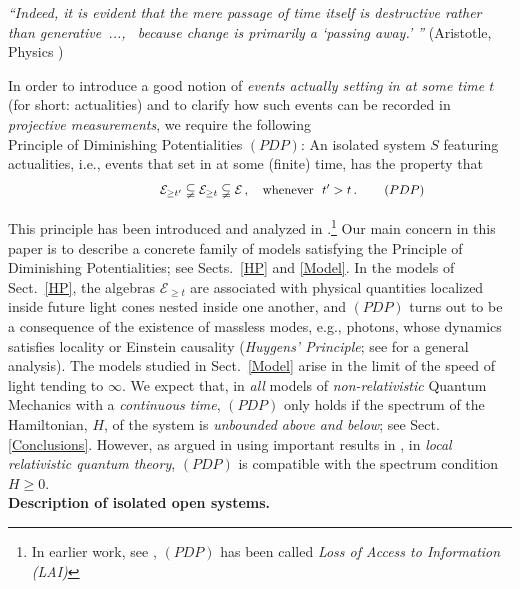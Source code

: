 \documentclass[12pt]{article}
\begin{document}
\hspace{0.5cm}\textit{``Indeed, it is evident that the mere passage of time itself is destructive rather than
\mbox{generative ..., } because change is primarily a `passing away.' ''}  (Aristotle, Physics )

In order to introduce a good notion of \textit{events actually setting in at some time $t$} (for short: actualities) and to clarify
how such events can be recorded in \textit{projective measurements}, we require the following \\

{Principle of Diminishing Potentialities} $(PDP)$: An isolated system $S$ featuring actualities, i.e., events that set in
at some (finite) time, has the property that
\begin{equation}\label{PDP}
 \hspace{4.2cm}  \mathcal{E}_{\geq t'} \subsetneqq \mathcal{E}_{\geq t} \subsetneqq \mathcal{E}\,, \quad \text{whenever}\,\,\,\, t'>t\,. \qquad\, (PDP) \hspace{2.4cm} \square
 \end{equation}


This principle has been introduced and analyzed in \cite{F-Schub, BFS, Fr1, Fr2}.\footnote{In earlier work, see \cite{BFS}, $(PDP)$ has
been called \textit{Loss of Access to Information (LAI)}}
Our main concern in this paper is to describe a concrete family of models satisfying the Principle of Diminishing Potentialities;
see Sects.~\ref{HP} and \ref{Model}. In the models of Sect.~\ref{HP}, the algebras $\mathcal{E}_{\geq t}$ are associated with
physical quantities localized inside future light cones nested inside one another, and $(PDP)$ turns out to be a
consequence of the existence of massless modes, e.g., photons, whose dynamics satisfies locality or Einstein
causality (\textit{Huygens' Principle}; see \cite{Buchholz} for a general analysis).
The models studied in Sect.~\ref{Model} arise in the limit of the speed of light tending to $\infty$. We expect that, in
\textit{all} models of \textit{non-relativistic} Quantum Mechanics with a \textit{continuous time}, $(PDP)$ only holds
if the spectrum of the Hamiltonian, $H$, of the system is \textit{unbounded above and below}; see Sect. \ref{Conclusions}.
However, as argued in \cite{Fr2} using important results in \cite{Buchholz}, in \textit{local relativistic quantum theory},
$(PDP)$ is compatible with the spectrum condition
$H\geq 0$.\\

{\bf{Description of isolated open systems.}}\\
\end{document}
